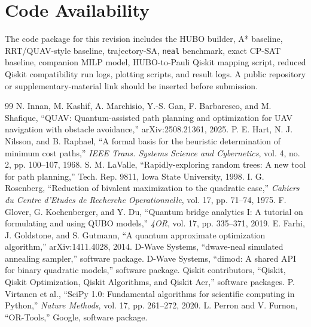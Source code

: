 \documentclass[10pt,conference]{IEEEtran}
\begin{document}
\section*{Code Availability}
The code package for this revision includes the HUBO builder, A* baseline, RRT/QUAV-style baseline, trajectory-SA, \texttt{neal} benchmark, exact CP-SAT baseline, companion MILP model, HUBO-to-Pauli Qiskit mapping script, reduced Qiskit compatibility run logs, plotting scripts, and result logs. A public repository or supplementary-material link should be inserted before submission.

\begin{thebibliography}{99}
 N. Innan, M. Kashif, A. Marchisio, Y.-S. Gan, F. Barbaresco, and M. Shafique, ``QUAV: Quantum-assisted path planning and optimization for UAV navigation with obstacle avoidance,'' arXiv:2508.21361, 2025.
 P. E. Hart, N. J. Nilsson, and B. Raphael, ``A formal basis for the heuristic determination of minimum cost paths,'' \emph{IEEE Trans. Systems Science and Cybernetics}, vol. 4, no. 2, pp. 100--107, 1968.
 S. M. LaValle, ``Rapidly-exploring random trees: A new tool for path planning,'' Tech. Rep. 9811, Iowa State University, 1998.
 I. G. Rosenberg, ``Reduction of bivalent maximization to the quadratic case,'' \emph{Cahiers du Centre d'Etudes de Recherche Operationnelle}, vol. 17, pp. 71--74, 1975.
 F. Glover, G. Kochenberger, and Y. Du, ``Quantum bridge analytics I: A tutorial on formulating and using QUBO models,'' \emph{4OR}, vol. 17, pp. 335--371, 2019.
 E. Farhi, J. Goldstone, and S. Gutmann, ``A quantum approximate optimization algorithm,'' arXiv:1411.4028, 2014.
 D-Wave Systems, ``dwave-neal simulated annealing sampler,'' software package.
 D-Wave Systems, ``dimod: A shared API for binary quadratic models,'' software package.
 Qiskit contributors, ``Qiskit, Qiskit Optimization, Qiskit Algorithms, and Qiskit Aer,'' software packages.
 P. Virtanen et al., ``SciPy 1.0: Fundamental algorithms for scientific computing in Python,'' \emph{Nature Methods}, vol. 17, pp. 261--272, 2020.
 L. Perron and V. Furnon, ``OR-Tools,'' Google, software package.
\end{thebibliography}
\end{document}

